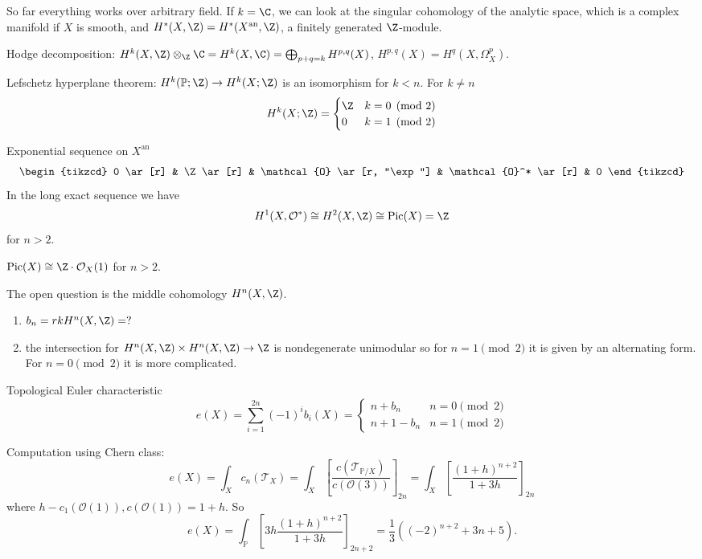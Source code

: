 \documentclass[a4paper]{article}
\renewcommand*{\P}{\mathbb{P}}
\newcommand{\sh}[1]{\mathcal{#1}} %
\DeclareMathOperator{\Pic}{Pic} %
\begin{document}
So far everything works over arbitrary field. If \(k = \C\), we can look at the singular cohomology of the analytic space, which is a complex manifold if \(X\) is smooth, and \(H^*(X, \Z) = H^*(X^{\text{an}}, \Z)\), a finitely generated \(\Z\)-module.

Hodge decomposition: \(H^k(X, \Z) \otimes_\Z \C = H^k(X, \C) = \bigoplus_{p + q = k} H^{p, q}(X)\), \(H^{p, q}(X) = H^q(X, \Omega_X^p)\).

Lefschetz hyperplane theorem: \(H^k(\P; \Z) \to H^k(X; \Z)\) is an isomorphism for \(k < n\). For \(k \ne n\)
\[
  H^k(X; \Z) =
  \begin{cases}
    \Z & k = 0 \pmod 2 \\
    0 & k = 1 \pmod 2
  \end{cases}
\]

Exponential sequence on \(X^{\text{an}}\)
\[
  \begin{tikzcd}
    0 \ar[r] & \Z \ar[r] & \sh O \ar[r, "\exp"] & \sh O^* \ar[r] & 0
  \end{tikzcd}
\]
In the long exact sequence we have
\[
  H^1(X, \sh O^*) \cong H^2(X, \Z) \cong \Pic (X) = \Z
\]
for \(n > 2\).

\begin{corollary}
  \(\Pic (X) \cong \Z \cdot \sh O_X(1)\) for \(n > 2\).
\end{corollary}

The open question is the middle cohomology \(H^n(X, \Z)\).
\begin{enumerate}
\item \(b_n = rk H^n(X, \Z) = ?\)
\item the intersection for \(H^n(X, \Z) \times H^n(X, \Z) \to \Z\) is nondegenerate unimodular so for \(n = 1 \pmod 2\) it is given by an alternating form. For \(n = 0 \pmod 2\) it is more complicated.
\end{enumerate}

Topological Euler characteristic
\[
  e(X) = \sum_{i = 1}^{2n} (-1)^i b_i(X) =
  \begin{cases}
    n + b_n & n = 0 \pmod 2 \\
    n + 1 - b_n & n = 1 \pmod 2
  \end{cases}
\]

Computation using Chern class:
\[
  e(X) = \int_X c_n(\sh T_X) = \int_X [\frac{c(\sh T_{\P/X})}{c(\sh O(3))}]_{2n} = \int_X [\frac{(1 + h)^{n + 2}}{1 + 3h}]_{2n}
\]
where \(h - c_1(\sh O(1)), c(\sh O(1)) = 1 + h\). So
\[
  e(X) = \int_\P [3h \frac{(1 + h)^{n + 2}}{1 + 3h}]_{2n + 2} = \frac{1}{3} ((-2)^{n + 2} + 3n + 5).
\]
\end{document}
